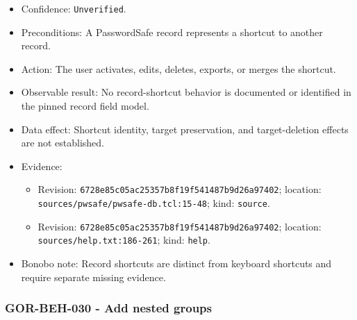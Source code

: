 \documentclass[
  letterpaper,
]{article}
\newcommand{\passthrough}[1]{#1}
\providecommand{\tightlist}{%
  \setlength{\itemsep}{0pt}\setlength{\parskip}{0pt}}
\begin{document}
\begin{itemize}
\tightlist
\item
  Confidence: \nolinkurl{Unverified}.
\item
  Preconditions: A PasswordSafe record represents a shortcut to another record.
\item
  Action: The user activates, edits, deletes, exports, or merges the shortcut.
\item
  Observable result: No record-shortcut behavior is documented or identified in the pinned record field model.
\item
  Data effect: Shortcut identity, target preservation, and target-deletion effects are not established.
\item
  Evidence:

  \begin{itemize}
  \tightlist
  \item
    Revision: \nolinkurl{6728e85c05ac25357b8f19f541487b9d26a97402}; location:
    \nolinkurl{sources/pwsafe/pwsafe-db.tcl:15-48}; kind: \passthrough{\lstinline!source!}.
  \item
    Revision: \nolinkurl{6728e85c05ac25357b8f19f541487b9d26a97402}; location: \nolinkurl{sources/help.txt:186-261};
    kind: \passthrough{\lstinline!help!}.
  \end{itemize}
\item
  Bonobo note: Record shortcuts are distinct from keyboard shortcuts and require separate missing evidence.
\end{itemize}

\subsubsection{GOR-BEH-030 - Add nested groups}\label{gor-beh-030---add-nested-groups}
\end{document}
